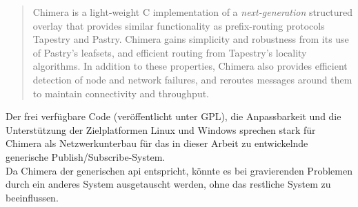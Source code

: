 \begin{quote}
Chimera is a light-weight C implementation of a \emph{next-generation} structured overlay that provides similar functionality as prefix-routing protocols Tapestry and Pastry.  Chimera gains simplicity and robustness from its use of Pastry's leafsets, and efficient routing from Tapestry's locality algorithms.  In addition to these properties, Chimera also provides efficient detection of node and network failures, and reroutes messages around them to maintain connectivity and throughput.  
\end{quote}

Der frei verfügbare Code (veröffentlicht unter GPL), die Anpassbarkeit und die Unterstützung der Zielplatformen Linux und Windows sprechen stark für Chimera als Netzwerkunterbau für das in dieser Arbeit zu entwickelnde generische Publish/Subscribe-System.\\
Da Chimera der generischen \ac{api} entspricht, könnte es bei gravierenden Problemen durch ein anderes System ausgetauscht werden, ohne das restliche System zu beeinflussen.
